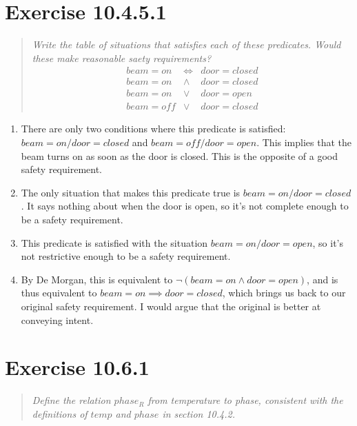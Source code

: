 \documentclass[10pt]{article}
\begin{document}
\section{Exercise 10.4.5.1}
\begin{quote}
  {\it Write the table of situations that satisfies each of these predicates.  Would these make
    reasonable saety requirements?}
    \begin{eqnarray}
      beam = on  & \iff  & door = closed \\
      beam = on  & \land & door = closed \\
      beam = on  & \lor  & door = open   \\
      beam = off & \lor  & door = closed
    \end{eqnarray}
\end{quote}
\begin{enumerate}
\item There are only two conditions where this predicate is satisfied: $beam=on/door=closed$ and
  $beam=off/door=open$.  This implies that the beam turns on as soon as the door is closed.  This is
  the opposite of a good safety requirement.

\item The only situation that makes this predicate true is $beam=on/door=closed$.  It says nothing
  about when the door is open, so it's not complete enough to be a safety requirement.

\item This predicate is satisfied with the situation $beam=on/door=open$, so it's not restrictive
  enough to be a safety requirement.

\item By De Morgan, this is equivalent to $\lnot (beam=on \land door=open)$, and is thus equivalent
  to $beam=on \implies door=closed$, which brings us back to our original safety requirement.  I
  would argue that the original is better at conveying intent.
\end{enumerate}



\section{Exercise 10.6.1}
\begin{quote}
  {\it Define the relation $phase_R$ from temperature to phase, consistent with the definitions of
    $temp$ and $phase$ in section 10.4.2.  }
\end{quote}
\end{document}
